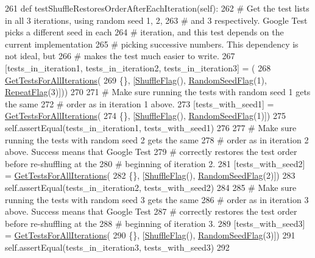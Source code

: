 \begin{DoxyCode}
261   \textcolor{keyword}{def }testShuffleRestoresOrderAfterEachIteration(self):
262     \textcolor{comment}{# Get the test lists in all 3 iterations, using random seed 1, 2,}
263     \textcolor{comment}{# and 3 respectively.  Google Test picks a different seed in each}
264     \textcolor{comment}{# iteration, and this test depends on the current implementation}
265     \textcolor{comment}{# picking successive numbers.  This dependency is not ideal, but}
266     \textcolor{comment}{# makes the test much easier to write.}
267     [tests\_in\_iteration1, tests\_in\_iteration2, tests\_in\_iteration3] = (
268         \hyperlink{namespacegtest__shuffle__test_a18c7606bf0d41acb73a4a6a2994d36fc}{GetTestsForAllIterations}(
269             \{\}, [\hyperlink{namespacegtest__shuffle__test_ab593e060bf2a9b2f0cb0dc8e18eb2088}{ShuffleFlag}(), \hyperlink{namespacegtest__shuffle__test_aaf2a94c748f266c4267ac7e7bb3451fd}{RandomSeedFlag}(1), 
      \hyperlink{namespacegtest__shuffle__test_a193f6cd2eeb35e7925dca6d8f72f75d3}{RepeatFlag}(3)]))
270 
271     \textcolor{comment}{# Make sure running the tests with random seed 1 gets the same}
272     \textcolor{comment}{# order as in iteration 1 above.}
273     [tests\_with\_seed1] = \hyperlink{namespacegtest__shuffle__test_a18c7606bf0d41acb73a4a6a2994d36fc}{GetTestsForAllIterations}(
274         \{\}, [\hyperlink{namespacegtest__shuffle__test_ab593e060bf2a9b2f0cb0dc8e18eb2088}{ShuffleFlag}(), \hyperlink{namespacegtest__shuffle__test_aaf2a94c748f266c4267ac7e7bb3451fd}{RandomSeedFlag}(1)])
275     self.assertEqual(tests\_in\_iteration1, tests\_with\_seed1)
276 
277     \textcolor{comment}{# Make sure running the tests with random seed 2 gets the same}
278     \textcolor{comment}{# order as in iteration 2 above.  Success means that Google Test}
279     \textcolor{comment}{# correctly restores the test order before re-shuffling at the}
280     \textcolor{comment}{# beginning of iteration 2.}
281     [tests\_with\_seed2] = \hyperlink{namespacegtest__shuffle__test_a18c7606bf0d41acb73a4a6a2994d36fc}{GetTestsForAllIterations}(
282         \{\}, [\hyperlink{namespacegtest__shuffle__test_ab593e060bf2a9b2f0cb0dc8e18eb2088}{ShuffleFlag}(), \hyperlink{namespacegtest__shuffle__test_aaf2a94c748f266c4267ac7e7bb3451fd}{RandomSeedFlag}(2)])
283     self.assertEqual(tests\_in\_iteration2, tests\_with\_seed2)
284 
285     \textcolor{comment}{# Make sure running the tests with random seed 3 gets the same}
286     \textcolor{comment}{# order as in iteration 3 above.  Success means that Google Test}
287     \textcolor{comment}{# correctly restores the test order before re-shuffling at the}
288     \textcolor{comment}{# beginning of iteration 3.}
289     [tests\_with\_seed3] = \hyperlink{namespacegtest__shuffle__test_a18c7606bf0d41acb73a4a6a2994d36fc}{GetTestsForAllIterations}(
290         \{\}, [\hyperlink{namespacegtest__shuffle__test_ab593e060bf2a9b2f0cb0dc8e18eb2088}{ShuffleFlag}(), \hyperlink{namespacegtest__shuffle__test_aaf2a94c748f266c4267ac7e7bb3451fd}{RandomSeedFlag}(3)])
291     self.assertEqual(tests\_in\_iteration3, tests\_with\_seed3)
292 
\end{DoxyCode}
